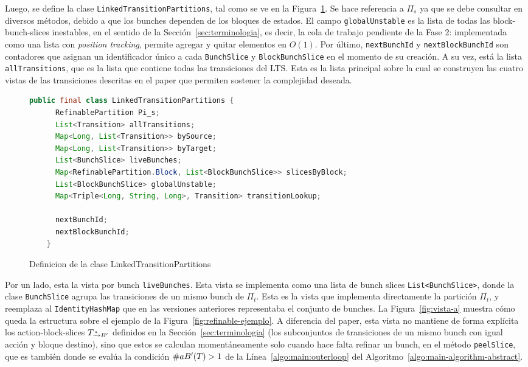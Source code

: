 Luego, se define la clase \texttt{LinkedTransitionPartitions}, tal como se ve en la Figura~\ref{fig:class-ltp}. Se hace referencia a $\Pi_s$ ya que se debe consultar en diversos métodos, debido a que los bunches dependen de los bloques de estados. El campo \texttt{globalUnstable} es la lista de todas las block-bunch-slices inestables, en el sentido de la Sección~\ref{sec:terminologia}, es decir, la cola de trabajo pendiente de la Fase 2: implementada como una lista con \emph{position tracking}, permite agregar y quitar elementos en $O(1)$. Por último, \texttt{nextBunchId} y \texttt{nextBlockBunchId} son contadores que asignan un identificador único a cada \texttt{BunchSlice} y \texttt{BlockBunchSlice} en el momento de su creación. A su vez, está la lista \texttt{allTransitions}, que es la lista que contiene todas las transiciones del LTS. Esta es la lista principal sobre la cual se construyen las cuatro vistas de las transiciones descritas en el paper que permiten sostener la complejidad deseada.

\begin{figure}[htbp]
  \centering
  \begin{minipage}{\linewidth}
  \begin{lstlisting}[language=Java, numbers=none]
    public final class LinkedTransitionPartitions {
      RefinablePartition Pi_s;
      List<Transition> allTransitions;
      Map<Long, List<Transition>> bySource;
      Map<Long, List<Transition>> byTarget;
      List<BunchSlice> liveBunches;
      Map<RefinablePartition.Block, List<BlockBunchSlice>> slicesByBlock;
      List<BlockBunchSlice> globalUnstable;
      Map<Triple<Long, String, Long>, Transition> transitionLookup;

      nextBunchId;
      nextBlockBunchId;
    }
  \end{lstlisting}
  \end{minipage}
  \caption{Definicion de la clase LinkedTransitionPartitions}
  \label{fig:class-ltp}
\end{figure}

Por un lado, esta la vista por bunch \texttt{liveBunches}. Esta vista se implementa como una lista de bunch slices \texttt{List<BunchSlice>}, donde la clase \texttt{BunchSlice} agrupa las transiciones de un mismo bunch de $\Pi_t$. Esta es la vista que implementa directamente la partición $\Pi_t$, y reemplaza al \texttt{IdentityHashMap} que en las versiones anteriores representaba el conjunto de bunches. La Figura~\ref{fig:vista-a} muestra cómo queda la estructura sobre el ejemplo de la Figura~\ref{fig:refinable-ejemplo}. A diferencia del paper, esta vista no mantiene de forma explícita los action-block-slices $\TaB$ definidos en la Sección~\ref{sec:terminologia} (los subconjuntos de transiciones de un mismo bunch con igual acción y bloque destino), sino que estos se calculan momentáneamente solo cuando hace falta refinar un bunch, en el método \texttt{peelSlice}, que es también donde se evalúa la condición $\nraB(T) > 1$ de la Línea~\ref{algo:main:outerloop} del Algoritmo~\ref{algo:main-algorithm-abstract}.

